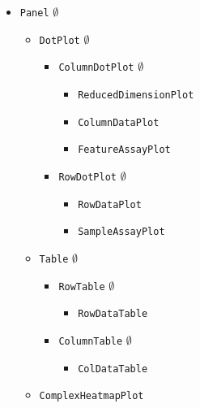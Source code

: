 \documentclass[]{book}
\providecommand{\tightlist}{%
  \setlength{\itemsep}{0pt}\setlength{\parskip}{0pt}}
\begin{document}
\begin{itemize}
\tightlist
\item
  \texttt{Panel} \(\emptyset\)

  \begin{itemize}
  \tightlist
  \item
    \texttt{DotPlot} \(\emptyset\)

    \begin{itemize}
    \tightlist
    \item
      \texttt{ColumnDotPlot} \(\emptyset\)

      \begin{itemize}
      \tightlist
      \item
        \texttt{ReducedDimensionPlot}
      \item
        \texttt{ColumnDataPlot}
      \item
        \texttt{FeatureAssayPlot}
      \end{itemize}
    \item
      \texttt{RowDotPlot} \(\emptyset\)

      \begin{itemize}
      \tightlist
      \item
        \texttt{RowDataPlot}
      \item
        \texttt{SampleAssayPlot}
      \end{itemize}
    \end{itemize}
  \item
    \texttt{Table} \(\emptyset\)

    \begin{itemize}
    \tightlist
    \item
      \texttt{RowTable} \(\emptyset\)

      \begin{itemize}
      \tightlist
      \item
        \texttt{RowDataTable}
      \end{itemize}
    \item
      \texttt{ColumnTable} \(\emptyset\)

      \begin{itemize}
      \tightlist
      \item
        \texttt{ColDataTable}
      \end{itemize}
    \end{itemize}
  \item
    \texttt{ComplexHeatmapPlot}
  \end{itemize}
\end{itemize}
\end{document}
